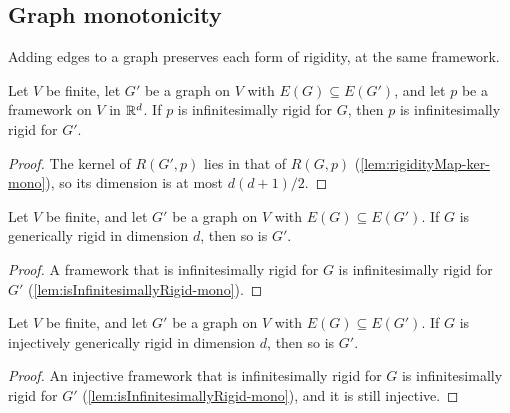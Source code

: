 \subsection{Graph monotonicity}

Adding edges to a graph preserves each form of rigidity, at the same
framework.

\begin{lemma}
  \label{lem:isInfinitesimallyRigid-mono}
  \leanok
  Let $V$ be finite, let $G'$ be a graph on $V$ with
  $E(G) \subseteq E(G')$, and let $p$ be a framework on $V$ in
  ${\mathbb{R}}^{d}$. If $p$ is infinitesimally rigid for $G$, then $p$ is
  infinitesimally rigid for $G'$.
\end{lemma}
\begin{proof}
  \leanok
  The kernel of $R(G', p)$ lies in that of $R(G, p)$
  (\cref{lem:rigidityMap-ker-mono}), so its dimension is at most
  $d(d+1)/2$.
\end{proof}

\begin{lemma}
  \label{lem:isGenericallyRigid-mono}
  \leanok
  Let $V$ be finite, and let $G'$ be a graph on $V$ with
  $E(G) \subseteq E(G')$. If $G$ is generically rigid in dimension $d$,
  then so is $G'$.
\end{lemma}
\begin{proof}
  \leanok
  A framework that is infinitesimally rigid for $G$ is infinitesimally
  rigid for $G'$ (\cref{lem:isInfinitesimallyRigid-mono}).
\end{proof}

\begin{lemma}
  \label{lem:isGenericallyRigidInj-mono}
  \leanok
  Let $V$ be finite, and let $G'$ be a graph on $V$ with
  $E(G) \subseteq E(G')$. If $G$ is injectively generically rigid in
  dimension $d$, then so is $G'$.
\end{lemma}
\begin{proof}
  \leanok
  An injective framework that is infinitesimally rigid for $G$ is
  infinitesimally rigid for $G'$ (\cref{lem:isInfinitesimallyRigid-mono}),
  and it is still injective.
\end{proof}

